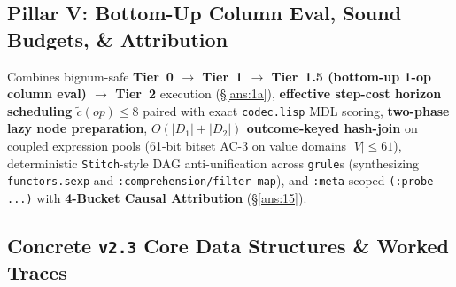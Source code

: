 \documentclass[12pt]{article}
\begin{document}
\subsection{Pillar V: Bottom-Up Column Eval, Sound Budgets, \& Attribution}
\label{sec:arch-lowering}

Combines bignum-safe \textbf{Tier~0 $\to$ Tier~1 $\to$ Tier~1.5 (bottom-up 1-op column eval) $\to$ Tier~2} execution (\S\ref{ans:1a}), \textbf{effective step-cost horizon scheduling $\tilde{c}(op)\le 8$} paired with exact \texttt{codec.lisp} MDL scoring, \textbf{two-phase lazy node preparation}, \textbf{$O(|D_1|+|D_2|)$ outcome-keyed hash-join} on coupled expression pools (61-bit bitset AC-3 on value domains $|V|\le 61$), deterministic \texttt{Stitch}-style DAG anti-unification across \texttt{grule}s (synthesizing \texttt{functors.sexp} and \texttt{:comprehension/filter-map}), and \texttt{:meta}-scoped \texttt{(:probe ...)} with \textbf{4-Bucket Causal Attribution} (\S\ref{ans:15}).

\subsection{Concrete \texttt{v2.3} Core Data Structures \& Worked Traces}
\label{sec:arch-structs}
\end{document}
